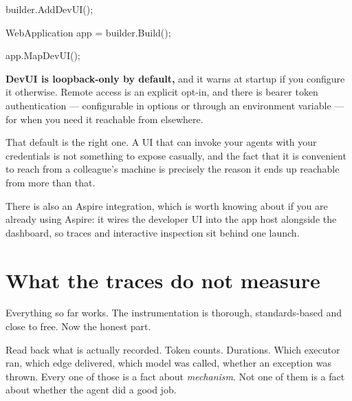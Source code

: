 \begin{csharp}[caption={Mounting DevUI}, label={lst:obs-devui}]
builder.AddDevUI();

WebApplication app = builder.Build();

app.MapDevUI();
\end{csharp}

\begin{note}
\textbf{DevUI is loopback-only by default,} and it warns at startup if you
configure it otherwise. Remote access is an explicit opt-in, and there is bearer
token authentication --- configurable in options or through an environment
variable --- for when you need it reachable from elsewhere.

That default is the right one. A UI that can invoke your agents with your
credentials is not something to expose casually, and the fact that it is
convenient to reach from a colleague's machine is precisely the reason it ends up
reachable from more than that.
\end{note}


There is also an Aspire integration, which is worth knowing about if you are
already using Aspire: it wires the developer UI into the app host alongside the
dashboard, so traces and interactive inspection sit behind one launch.

\section{What the traces do not measure}
\label{sec:obs-gap}

Everything so far works. The instrumentation is thorough, standards-based and
close to free. Now the honest part.

Read back what is actually recorded. Token counts. Durations. Which executor ran,
which edge delivered, which model was called, whether an exception was thrown.
Every one of those is a fact about \emph{mechanism}. Not one of them is a fact
about whether the agent did a good job.

